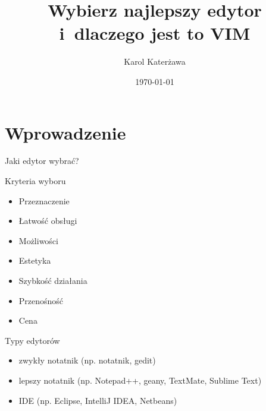 \documentclass{beamer}
\title[VIM]{Wybierz najlepszy edytor\\i~dlaczego jest to VIM} %
\author{Karol Katerżawa} %
\institute[IAiIS] %
{
Instytut Automatyki i~Informatyki Stosowanej \\ %
\medskip
\textit{\textbf{Promotor:} dr~inż. Tomasz Kornuta} %
}
\date{\today} %
\begin{document}
\begin{frame}
\titlepage %
\end{frame}



\section{Wprowadzenie}
\label{sec:Wprowadzenie}

\begin{frame}[t]{Jaki edytor wybrać?}
  \begin{block}{Kryteria wyboru}
    \begin{itemize}
      \item Przeznaczenie
      \item Łatwość obsługi
      \item Możliwości
      \item Estetyka
      \item Szybkość działania
      \item Przenośność
      \item Cena
    \end{itemize}
  \end{block}
\end{frame}

\begin{frame}[t]{Typy edytorów}
  \begin{itemize}
    \item zwykły notatnik (np. notatnik, gedit)
    \item lepszy notatnik (np. Notepad++, geany, TextMate, Sublime Text)
    \item IDE (np. Eclipse, IntelliJ IDEA, Netbeans)
  \end{itemize}
\end{frame}
\end{document}
